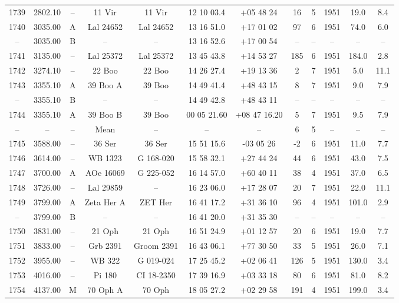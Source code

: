 \begin{table}
\begin{tabular}{cccccccccccc}
1739 & 2802.10 & -- & 11 Vir & 11 Vir & 12 10 03.4 & +05 48 24 & 16 & 5 & 1951 & 19.0 & 8.4 \\
1740 & 3035.00 & A & Lal 24652 & Lal 24652 & 13 16 51.0 & +17 01 02 & 97 & 6 & 1951 & 74.0 & 6.0 \\
-- & 3035.00 & B & -- & -- & 13 16 52.6 & +17 00 54 & -- & -- & -- & -- & -- \\
1741 & 3135.00 & -- & Lal 25372 & Lal 25372 & 13 45 43.8 & +14 53 27 & 185 & 6 & 1951 & 184.0 & 2.8 \\
1742 & 3274.10 & -- & 22 Boo & 22 Boo & 14 26 27.4 & +19 13 36 & 2 & 7 & 1951 & 5.0 & 11.1 \\
1743 & 3355.10 & A & 39 Boo A & 39 Boo & 14 49 41.4 & +48 43 15 & 8 & 7 & 1951 & 9.0 & 7.9 \\
-- & 3355.10 & B & -- & -- & 14 49 42.8 & +48 43 11 & -- & -- & -- & -- & -- \\
1744 & 3355.10 & A & 39 Boo B & 39 Boo & 00 05 21.60 & +08 47 16.20 & 5 & 7 & 1951 & 9.5 & 7.9 \\
-- & -- & -- & Mean & -- & -- & -- & 6 & 5 & -- & -- & -- \\
1745 & 3588.00 & -- & 36 Ser & 36 Ser & 15 51 15.6 & -03 05 26 & -2 & 6 & 1951 & 11.0 & 7.7 \\
1746 & 3614.00 & -- & WB 1323 & G 168-020 & 15 58 32.1 & +27 44 24 & 44 & 6 & 1951 & 43.0 & 7.5 \\
1747 & 3700.00 & A & AOe 16069 & G 225-052 & 16 14 57.0 & +60 40 11 & 38 & 4 & 1951 & 37.0 & 6.5 \\
1748 & 3726.00 & -- & Lal 29859 & -- & 16 23 06.0 & +17 28 07 & 20 & 7 & 1951 & 22.0 & 11.1 \\
1749 & 3799.00 & A & Zeta Her A & ZET Her & 16 41 17.2 & +31 36 10 & 96 & 4 & 1951 & 101.0 & 2.9 \\
-- & 3799.00 & B & -- & -- & 16 41 20.0 & +31 35 30 & -- & -- & -- & -- & -- \\
1750 & 3831.00 & -- & 21 Oph & 21 Oph & 16 51 24.9 & +01 12 57 & 20 & 6 & 1951 & 19.0 & 7.7 \\
1751 & 3833.00 & -- & Grb 2391 & Groom 2391 & 16 43 06.1 & +77 30 50 & 33 & 5 & 1951 & 26.0 & 7.1 \\
1752 & 3955.00 & -- & WB 322 & G 019-024 & 17 25 45.2 & +02 06 41 & 126 & 5 & 1951 & 130.0 & 3.4 \\
1753 & 4016.00 & -- & Pi 180 & CI 18-2350 & 17 39 16.9 & +03 33 18 & 80 & 6 & 1951 & 81.0 & 8.2 \\
1754 & 4137.00 & M & 70 Oph A & 70 Oph & 18 05 27.2 & +02 29 58 & 191 & 4 & 1951 & 199.0 & 3.4 \\

\end{tabular}
\end{table}
